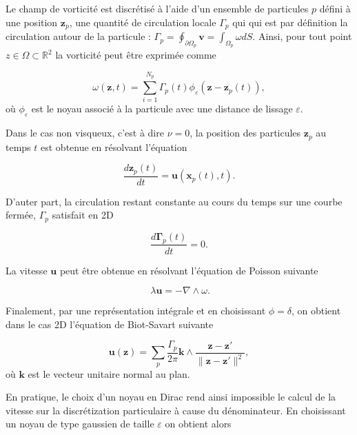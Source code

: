 Le champ de vorticité est discrétisé à l'aide d'un ensemble de particules $p$ défini à une position $\bm z_p$, une quantité de circulation locale $\Gamma_p$ qui qui est par définition la circulation autour de la particule : $\Gamma_p = \oint_{\partial \Omega_p} \bm v = \int_{\Omega_p} \omega dS$. Ainsi, pour tout point $z \in \Omega \subset \mathbb R^2$ la vorticité peut être exprimée comme

\begin{equation*}
    \omega(\bm z, t) = \sum_{i=1}^{N_p} \Gamma_p(t) \phi_\varepsilon(\bm z - \bm z_p(t)),
\end{equation*}où $\phi_\varepsilon$ est le noyau associé à la particule avec une distance de lissage $\varepsilon$.

Dans le cas non visqueux, c'est à dire $\nu = 0$, la position des particules $\bm z_p$ au temps $t$ est obtenue en résolvant l'équation

\begin{equation*}
    \frac{d\bm z_p(t)}{dt} = \bm u (\bm x_p(t), t).
\end{equation*}

D'auter part, la circulation restant constante au cours du temps sur une courbe fermée, $\Gamma_p$ satisfait en 2D

\begin{equation*}
    \frac{d\bm \Gamma_p(t)}{dt} = 0.
\end{equation*}

La vitesse $\bm u$ peut être obtenue en résolvant l'équation de Poisson suivante

\begin{equation*}~\label{eq:poisson}
    \lambda \bm u = - \nabla \wedge \omega.
\end{equation*}

Finalement, par une représentation intégrale et en choisissant $\phi= \delta$, on obtient dans le cas 2D l'équation de Biot-Savart suivante

\begin{equation*}
    \bm u(\bm z) = \sum_p \frac{\Gamma_p}{2\pi}  \bm k \wedge \frac{\bm z - \bm z'}{\|\bm z - \bm z'\|^2},
\end{equation*}où $\bm k$ est le vecteur unitaire normal au plan.

En pratique, le choix d'un noyau en Dirac rend ainsi impossible le calcul de la vitesse sur la discrétization particulaire à cause du dénominateur. En choisissant un noyau de type gaussien de taille $\varepsilon$ on obtient alors

